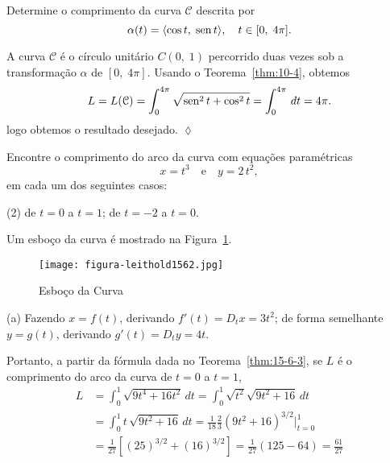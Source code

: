 \begin{exc}
Determine o comprimento da curva \(\mathcal{C}\) descrita por
\begin{equation*}
\alpha(t) =\langle \cos t,\; \operatorname{sen} t \rangle, \quad  t \in [0,\; 4\pi].
\end{equation*}
\end{exc}

\solo 
A curva \(\mathcal{C}\) é o círculo unitário \(C(0,\; 1)\) percorrido duas vezes sob a 
transformação \(\alpha\) de \([0,\; 4\pi]\). Usando o Teorema~\ref{thm:10-4}, obtemos
\begin{equation*}
L=L(\mathcal{C})=\int_{0}^{4\pi}\sqrt{\operatorname{sen}^{2}t+\cos^{2} t}=\int_{0}^{4\pi}\,dt=
4\pi.
\end{equation*}
logo obtemos o resultado desejado. \hfill \(\lozenge\)


\begin{exc}
Encontre o comprimento do arco da curva com equações paramétricas
\begin{equation*}
x = t^{3} \quad \text{e} \quad y = 2\,t^{2},
\end{equation*}
em cada um dos seguintes casos: 
\begin{tasks}[label=(\alph*),item-indent=4em,label-width=4ex,ref=(\alph*)](2)
\task de \(t = 0\) a \(t = 1\);
\task de \(t = -2\) a \(t = 0\).
\end{tasks}
\end{exc}

\solo
Um esboço da curva é mostrado na Figura~\ref{fig:1562}.

\begin{figure}[H]
  \centering
  \texttt{[image: figura-leithold1562.jpg]}
  \caption{Esboço da Curva}\label{fig:1562}
\end{figure}

(a) Fazendo \(x =f(t)\), derivando \(f'(t) = D_{t}x = 3t^{2}\); de forma semelhante \(y = g(t)\), derivando
\(g'(t) = D_{t}y = 4t\).

Portanto, a partir da fórmula dada no Teorema~\ref{thm:15-6-3}, se \(L\)  é o comprimento do arco da curva de \(t = 0\) a \(t = 1\),
\begin{align*}
  L & = \int_{0}^{1}\sqrt{9t^{4}+16t^{2}}\, dt=\int_{0}^{1}\sqrt{t^{2}}\sqrt{9t^{2}+16}\, dt \\[2ex]
    & = \int_{0}^{1}t\,\sqrt{9t^{2}+16}\, dt= \frac{1}{18}\frac{2}{3}\left(9t^{2}+16\right)^{3/2}\Bigg\vert_{t=0}^{1}\\[2ex]
    & =\frac{1}{27}\left[(25)^{3/2}+(16)^{3/2}\right]= \frac{1}{27}\left(125-64\right)=\frac{61}{27}
\end{align*}


